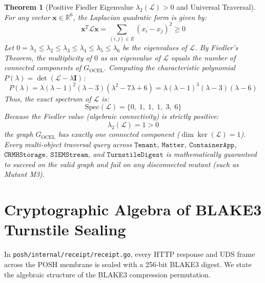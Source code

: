 \documentclass[10pt,twoside,openany]{book}
\theoremstyle{plain}
\newtheorem{theorem}{Theorem}[chapter]
\theoremstyle{definition}
\theoremstyle{remark}
\newcommand{\Lap}{\mathcal{L}}
\newcommand{\R}{\mathbb{R}}
\begin{document}
\begin{theorem}[Positive Fiedler Eigenvalue $\lambda_2(\Lap) > 0$ and Universal Traversal]
For any vector $\mathbf{x} \in \R^6$, the Laplacian quadratic form is given by:
\begin{equation}
\mathbf{x}^T \Lap \mathbf{x} = \sum_{(i, j) \in E} (x_i - x_j)^2 \ge 0
\end{equation}
Let $0 = \lambda_1 \le \lambda_2 \le \lambda_3 \le \lambda_4 \le \lambda_5 \le \lambda_6$ be the eigenvalues of $\Lap$. By Fiedler's Theorem, the multiplicity of $0$ as an eigenvalue of $\Lap$ equals the number of connected components of $G_{\mathrm{OCEL}}$. Computing the characteristic polynomial $P(\lambda) = \det(\Lap - \lambda \mathbf{I})$:
\begin{equation}
P(\lambda) = \lambda (\lambda - 1)^2 (\lambda - 3) (\lambda^2 - 7\lambda + 6) = \lambda (\lambda - 1)^3 (\lambda - 3) (\lambda - 6)
\end{equation}
Thus, the exact spectrum of $\Lap$ is:
\begin{equation}
\mathrm{Spec}(\Lap) = \{ 0,\; 1,\; 1,\; 1,\; 3,\; 6 \}
\end{equation}
Because the Fiedler value (algebraic connectivity) is strictly positive:
\begin{equation}
\lambda_2(\Lap) = 1 > 0
\end{equation}
the graph $G_{\mathrm{OCEL}}$ has exactly one connected component ($\dim \ker(\Lap) = 1$). Every multi-object traversal query across $\mathtt{Tenant}$, $\mathtt{Matter}$, $\mathtt{ContainerApp}$, $\mathtt{CRMHStorage}$, $\mathtt{SIEMStream}$, and $\mathtt{TurnstileDigest}$ is mathematically guaranteed to succeed on the valid graph and fail on any disconnected mutant (such as Mutant M3).
\end{theorem}

\section{Cryptographic Algebra of BLAKE3 Turnstile Sealing}
In \texttt{posh/internal/receipt/receipt.go}, every HTTP response and UDS frame across the POSH membrane is sealed with a 256-bit BLAKE3 digest. We state the algebraic structure of the BLAKE3 compression permutation.
\end{document}
